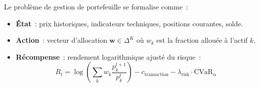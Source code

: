 \begin{definition}
Le probl\`eme de gestion de portefeuille se formalise comme~:
\begin{itemize}
    \item \textbf{\'Etat}~: prix historiques, indicateurs techniques, positions
    courantes, solde.
    \item \textbf{Action}~: vecteur d'allocation $\mathbf{w} \in \Delta^K$ o\`u
    $w_k$ est la fraction allou\'ee \`a l'actif $k$.
    \item \textbf{R\'ecompense}~: rendement logarithmique ajust\'e du risque~:
    \[
        R_t = \log\left(\sum_k w_k \frac{p_k^{t+1}}{p_k^t}\right) - c_{\text{transaction}}
        - \lambda_{\text{risk}} \cdot \text{CVaR}_\alpha
    \]
\end{itemize}
\end{definition}

